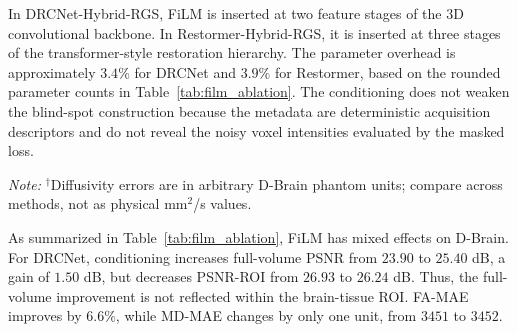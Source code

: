 \documentclass[preprint,12pt]{elsarticle}
\begin{document}
In DRCNet-Hybrid-RGS, FiLM is inserted at two feature stages of the 3D convolutional backbone. In Restormer-Hybrid-RGS, it is inserted at three stages of the transformer-style restoration hierarchy. The parameter overhead is approximately $3.4\%$ for DRCNet and $3.9\%$ for Restormer, based on the rounded parameter counts in Table~\ref{tab:film_ablation}. The conditioning does not weaken the blind-spot construction because the metadata are deterministic acquisition descriptors and do not reveal the noisy voxel intensities evaluated by the masked loss.

\begin{table}[ht]
  \centering
  \caption{Gradient direction conditioning ablation on D-Brain. FiLM improves full-volume PSNR for both backbones but slightly degrades PSNR-ROI, indicating metric-dependent behavior rather than a uniform denoising benefit.}
  \label{tab:film_ablation}
\end{table}
\par\noindent\textit{Note:} $^\dagger$Diffusivity errors are in arbitrary D-Brain phantom units; compare across methods, not as physical mm$^2$/s values.

As summarized in Table~\ref{tab:film_ablation}, FiLM has mixed effects on D-Brain. For DRCNet, conditioning increases full-volume PSNR from $23.90$ to $25.40$ dB, a gain of $1.50$ dB, but decreases PSNR-ROI from $26.93$ to $26.24$ dB. Thus, the full-volume improvement is not reflected within the brain-tissue ROI. FA-MAE improves by $6.6\%$, while MD-MAE changes by only one unit, from $3451$ to $3452$.
\end{document}
